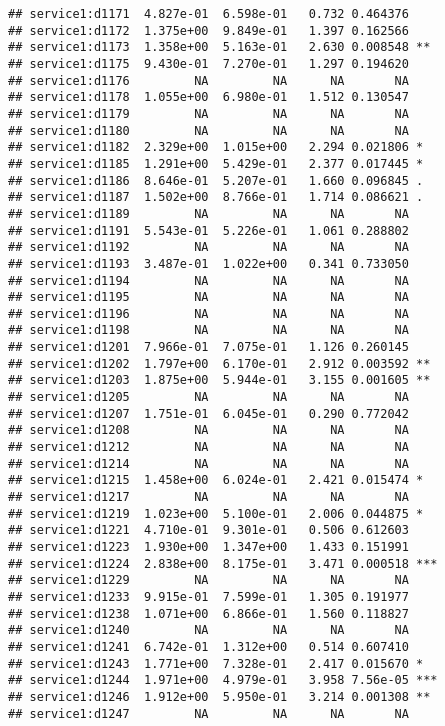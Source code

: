 \documentclass[
]{article}
\begin{document}
\begin{verbatim}
## service1:d1171  4.827e-01  6.598e-01   0.732 0.464376    
## service1:d1172  1.375e+00  9.849e-01   1.397 0.162566    
## service1:d1173  1.358e+00  5.163e-01   2.630 0.008548 ** 
## service1:d1175  9.430e-01  7.270e-01   1.297 0.194620    
## service1:d1176         NA         NA      NA       NA    
## service1:d1178  1.055e+00  6.980e-01   1.512 0.130547    
## service1:d1179         NA         NA      NA       NA    
## service1:d1180         NA         NA      NA       NA    
## service1:d1182  2.329e+00  1.015e+00   2.294 0.021806 *  
## service1:d1185  1.291e+00  5.429e-01   2.377 0.017445 *  
## service1:d1186  8.646e-01  5.207e-01   1.660 0.096845 .  
## service1:d1187  1.502e+00  8.766e-01   1.714 0.086621 .  
## service1:d1189         NA         NA      NA       NA    
## service1:d1191  5.543e-01  5.226e-01   1.061 0.288802    
## service1:d1192         NA         NA      NA       NA    
## service1:d1193  3.487e-01  1.022e+00   0.341 0.733050    
## service1:d1194         NA         NA      NA       NA    
## service1:d1195         NA         NA      NA       NA    
## service1:d1196         NA         NA      NA       NA    
## service1:d1198         NA         NA      NA       NA    
## service1:d1201  7.966e-01  7.075e-01   1.126 0.260145    
## service1:d1202  1.797e+00  6.170e-01   2.912 0.003592 ** 
## service1:d1203  1.875e+00  5.944e-01   3.155 0.001605 ** 
## service1:d1205         NA         NA      NA       NA    
## service1:d1207  1.751e-01  6.045e-01   0.290 0.772042    
## service1:d1208         NA         NA      NA       NA    
## service1:d1212         NA         NA      NA       NA    
## service1:d1214         NA         NA      NA       NA    
## service1:d1215  1.458e+00  6.024e-01   2.421 0.015474 *  
## service1:d1217         NA         NA      NA       NA    
## service1:d1219  1.023e+00  5.100e-01   2.006 0.044875 *  
## service1:d1221  4.710e-01  9.301e-01   0.506 0.612603    
## service1:d1223  1.930e+00  1.347e+00   1.433 0.151991    
## service1:d1224  2.838e+00  8.175e-01   3.471 0.000518 ***
## service1:d1229         NA         NA      NA       NA    
## service1:d1233  9.915e-01  7.599e-01   1.305 0.191977    
## service1:d1238  1.071e+00  6.866e-01   1.560 0.118827    
## service1:d1240         NA         NA      NA       NA    
## service1:d1241  6.742e-01  1.312e+00   0.514 0.607410    
## service1:d1243  1.771e+00  7.328e-01   2.417 0.015670 *  
## service1:d1244  1.971e+00  4.979e-01   3.958 7.56e-05 ***
## service1:d1246  1.912e+00  5.950e-01   3.214 0.001308 ** 
## service1:d1247         NA         NA      NA       NA    

\end{verbatim}
\end{document}
